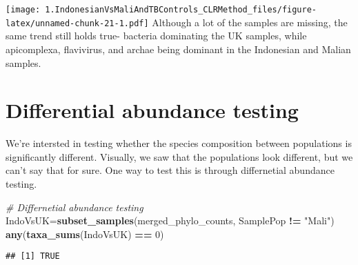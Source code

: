 \documentclass[]{article}
\newenvironment{Shaded}{\begin{snugshade}}{\end{snugshade}}
\newcommand{\CommentTok}[1]{\textcolor[rgb]{0.56,0.35,0.01}{\textit{#1}}}
\newcommand{\DecValTok}[1]{\textcolor[rgb]{0.00,0.00,0.81}{#1}}
\newcommand{\KeywordTok}[1]{\textcolor[rgb]{0.13,0.29,0.53}{\textbf{#1}}}
\newcommand{\NormalTok}[1]{#1}
\newcommand{\OperatorTok}[1]{\textcolor[rgb]{0.81,0.36,0.00}{\textbf{#1}}}
\newcommand{\StringTok}[1]{\textcolor[rgb]{0.31,0.60,0.02}{#1}}
\begin{document}
\texttt{[image: 1.IndonesianVsMaliAndTBControls\_CLRMethod\_files/figure-latex/unnamed-chunk-21-1.pdf]}
Although a lot of the samples are missing, the same trend still holds
true- bacteria dominating the UK samples, while apicomplexa, flavivirus,
and archae being dominant in the Indonesian and Malian samples.

\hypertarget{differential-abundance-testing}{%
\section{Differential abundance
testing}\label{differential-abundance-testing}}

We're intersted in testing whether the species composition between
populations is significantly different. Visually, we saw that the
populations look different, but we can't say that for sure. One way to
test this is through differnetial abundance testing.

\begin{Shaded}
\begin{Highlighting}[]
\CommentTok{# Differnetial abundance testing}
\NormalTok{IndoVsUK=}\KeywordTok{subset_samples}\NormalTok{(merged_phylo_counts, SamplePop }\OperatorTok{!=}\StringTok{ "Mali"}\NormalTok{)}
\KeywordTok{any}\NormalTok{(}\KeywordTok{taxa_sums}\NormalTok{(IndoVsUK) }\OperatorTok{==}\StringTok{ }\DecValTok{0}\NormalTok{)}
\end{Highlighting}
\end{Shaded}

\begin{verbatim}
## [1] TRUE
\end{verbatim}
\end{document}

